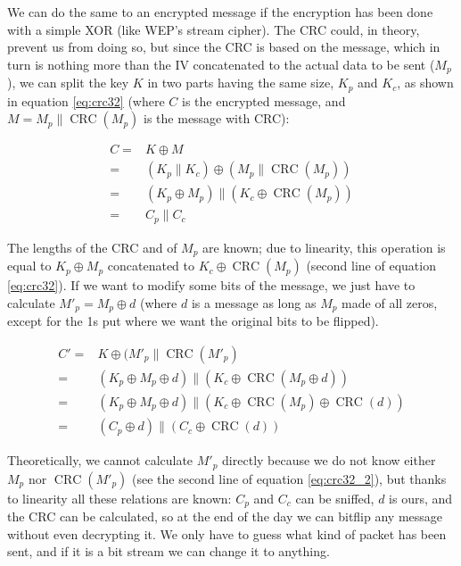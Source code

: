 We can do the same to an encrypted message if the encryption has been done with a simple XOR (like WEP's stream cipher). The CRC could, in theory, prevent us from doing so, but since the CRC is based on the message, which in turn is nothing more than the IV concatenated to the actual data to be sent ($M_p$), we can split the key $K$ in two parts having the same size, $K_p$ and $K_c$, as shown in equation \ref{eq:crc32} (where $C$ is the encrypted message, and $M = M_p \parallel \operatorname{CRC}(M_p)$ is the message with CRC):

\begin{equation}
\label{eq:crc32}
\begin{aligned}
    C =& K \oplus M\\
    =& (K_p \parallel K_c)  \oplus (M_p \parallel \operatorname{CRC}(M_p))\\
    =& (K_p \oplus M_p) \parallel (K_c \oplus \operatorname{CRC}(M_p))\\
    =& C_p \parallel C_c
\end{aligned}
\end{equation}

The lengths of the CRC and of $M_p$ are known; due to linearity, this operation is equal to $K_p \oplus M_p$ concatenated to $K_c \oplus \operatorname{CRC}(M_p)$ (second line of equation \ref{eq:crc32}). If we want to modify some bits of the message, we just have to calculate $M'_p = M_p \oplus d$ (where $d$ is a message as long as $M_p$ made of all zeros, except for the 1s put where we want the original bits to be flipped).

\begin{equation}
\label{eq:crc32_2}
\begin{aligned}
    C' =& K \oplus (M'_p \parallel \operatorname{CRC} (M'_p) \\
    =& (K_p \oplus M_p \oplus d) \parallel (K_c \oplus \operatorname{CRC}(M_p \oplus d)) \\
    =& (K_p \oplus M_p \oplus d) \parallel (K_c \oplus \operatorname{CRC}(M_p) \oplus \operatorname{CRC} (d)) \\
    =& (C_p \oplus d) \parallel (C_c \oplus  \operatorname{CRC}(d))
    \end{aligned}
\end{equation}

Theoretically, we cannot calculate $M'_p$ directly because we do not know either $M_p$ nor $\operatorname{CRC}(M'_p)$ (see the second line of equation \ref{eq:crc32_2}), but thanks to linearity all these relations are known: $C_p$ and $C_c$ can be sniffed, $d$ is ours, and the CRC can be calculated, so at the end of the day we can bitflip any message without even decrypting it. We only have to guess what kind of packet has been sent, and if it is a bit stream we can change it to anything.


